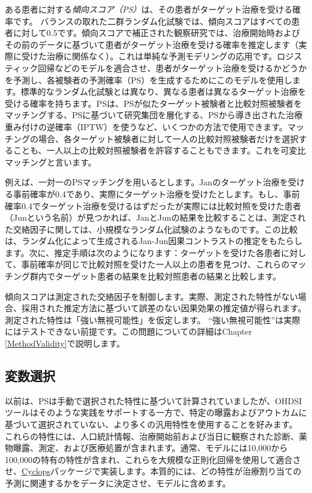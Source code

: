 \documentclass[
  11pt]{book}
\theoremstyle{definition}
\theoremstyle{definition}
\theoremstyle{definition}
\theoremstyle{definition}
\theoremstyle{remark}
\begin{document}
ある患者に対する\emph{傾向スコア（PS）}は、その患者がターゲット治療を受ける確率です。\citep{rosenbaum_1983} バランスの取れた二群ランダム化試験では、傾向スコアはすべての患者に対して0.5です。傾向スコアで補正された観察研究では、治療開始時およびその前のデータに基づいて患者がターゲット治療を受ける確率を推定します（実際に受けた治療に関係なく）。これは単純な予測モデリングの応用です。ロジスティック回帰などのモデルを適合させ、患者がターゲット治療を受けるかどうかを予測し、各被験者の予測確率（PS）を生成するためにこのモデルを使用します。標準的なランダム化試験とは異なり、異なる患者は異なるターゲット治療を受ける確率を持ちます。PSは、PSが似たターゲット被験者と比較対照被験者をマッチングする、PSに基づいて研究集団を層化する、PSから導き出された治療重み付けの逆確率（IPTW）を使うなど、いくつかの方法で使用できます。マッチングの場合、各ターゲット被験者に対して一人の比較対照被験者だけを選択することも、一人以上の比較対照被験者を許容することもできます。これを可変比マッチングと言います。\citep{rassen_2012}      

例えば、一対一のPSマッチングを用いるとします。Janのターゲット治療を受ける事前確率が0.4であり、実際にターゲット治療を受けたとします。もし、事前確率0.4でターゲット治療を受けるはずだったが実際には比較対照を受けた患者（Junという名前）が見つかれば、JanとJunの結果を比較することは、測定された交絡因子に関しては、小規模なランダム化試験のようなものです。この比較は、ランダム化によって生成されるJan-Jun因果コントラストの推定をもたらします。次に、推定手順は次のようになります：ターゲットを受けた各患者に対して、事前確率が同じで比較対照を受けた一人以上の患者を見つけ、これらのマッチング群内でターゲット患者の結果を比較対照患者の結果と比較します。

傾向スコアは測定された交絡因子を制御します。実際、測定された特性がない場合、採用された推定方法に基づいて誤差のない因果効果の推定値が得られます。測定された特性は「強い無視可能性」を仮定します。 ``強い無視可能性''は実際にはテストできない前提です。この問題についての詳細はChapter \ref{MethodValidity}で説明します。 

\subsection{変数選択}\label{VariableSelection}

以前は、PSは手動で選択された特性に基づいて計算されていましたが、OHDSIツールはそのような実践をサポートする一方で、特定の曝露およびアウトカムに基づいて選択されていない、より多くの汎用特性を使用することを好みます。\citep{tian_2018} これらの特性には、人口統計情報、治療開始前および当日に観察された診断、薬物曝露、測定、および医療処置が含まれます。通常、モデルには10,000から100,000の特有の特性が含まれ、これらを大規模な正則化回帰\citep{suchard_2013}を使用して適合させ、\href{https://ohdsi.github.io/Cyclops/}{Cyclops}パッケージで実装します。本質的には、どの特性が治療割り当ての予測に関連するかをデータに決定させ、モデルに含めます。
\end{document}

